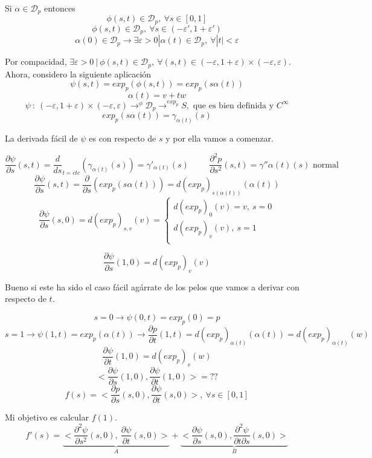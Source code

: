 \documentclass[openany]{book}
\begin{document}
\begin{demonstration}
  Si $ \alpha  \in \mathcal{D}_p$ entonces
  $$ \phi(s,t) \in \mathcal{D}_p , \ \forall s \in [0,1] $$
  $$ \phi(s,t) \in \mathcal{D}_p , \ \forall s \in (- \varepsilon ', 1+ \varepsilon ') $$
  $$ \alpha (0) \in \mathcal{D}_p \to \exists \varepsilon >0 | \alpha (t) \in \mathcal{D}_p, \ \forall |t| < \varepsilon  $$

  Por compacidad, $\exists \varepsilon >0 \ | \ \phi(s,t) \in \mathcal{D}_p , \ \forall (s,t) \in (- \varepsilon , 1+\varepsilon ) \times (-\varepsilon , \varepsilon )$. Ahora, considero la siguiente aplicación $$\psi(s,t) = exp_p(\phi(s,t)) = exp_p(s\alpha (t))$$
  $$ \alpha (t) = v + tw $$
  $$ \psi \ : \ (-\varepsilon , 1 + \varepsilon ) \times (-\varepsilon , \varepsilon ) \to ^\phi \mathcal{D}_p \to ^{exp_p} S, \text{ que es bien definida y }C^\infty  $$
  $$ exp_p(s\alpha (t)) = \gamma _ {\alpha(t)}(s) $$

  La derivada fácil de $\psi$ es con respecto de $s$ y por ella vamos a comenzar.

  $$ \dfrac{\partial \psi}{\partial s}(s,t) = \dfrac{d }{ds}_{t=cte}(\gamma _ {\alpha (t)} (s)) = \gamma '_{\alpha (t)}(s) \hspace{1cm} \dfrac{\partial ^2 p}{\partial s^2}  (s,t) = \gamma ''{\alpha (t)}(s) \text{ normal}$$
  $$ \dfrac{\partial \psi}{\partial s}(s,t) = \dfrac{\partial }{\partial s}(exp_p(s \alpha (t))) = d(exp_p)_{s(\alpha (t))}(\alpha (t))  $$
  $$ \dfrac{\partial \psi}{\partial s}(s,0) = d(exp_p)_{s,v}(v) = \left\{ \begin{array}{l}
    d(exp_p)_0(v) = v, \ s=0\\
    d(exp_p)_v(v) , \ s=1\\
  \end{array} \right.  $$

  $$ \dfrac{\partial \psi}{\partial s}(1,0) = d(exp_p)_v(v)  $$


  Bueno si este ha sido el caso fácil agárrate de los pelos que vamos a derivar con respecto de $t$.

  $$ s=0 \to \psi(0,t) = exp_p(0) = p $$
  $$ s=1 \to \psi(1,t) = exp_p(\alpha (t)) \to \dfrac{\partial p}{\partial t}(1,t) = d(exp_p)_ {\alpha(t)} (\alpha (t)) = d(exp_p)_{\alpha (t)}(w) $$
  $$ \dfrac{\partial \psi}{\partial t}(1,0) = d(exp_p)_v(w)  $$
  $$ <\dfrac{\partial \psi}{\partial s}(1,0), \dfrac{\partial \psi}{\partial t}(1,0)>= ?? $$
  $$ f(s) = < \dfrac{\partial p}{\partial s}(s,0), \dfrac{\partial \psi}{\partial t}(s,0)> , \ \forall s \in [0,1] $$

  Mi objetivo es calcular $f(1)$.
  $$ f'(s) = \underbrace{ <\dfrac{\partial ^2 \psi}{\partial s^2}(s,0) , \ \dfrac{\partial \psi}{\partial t}(s,0)> }_{ A } + \underbrace{ <\dfrac{\partial \psi}{\partial s}(s,0), \dfrac{\partial ^2\psi}{\partial t \partial s}(s,0) > }_{ B }   $$


\end{demonstration}
\end{document}
